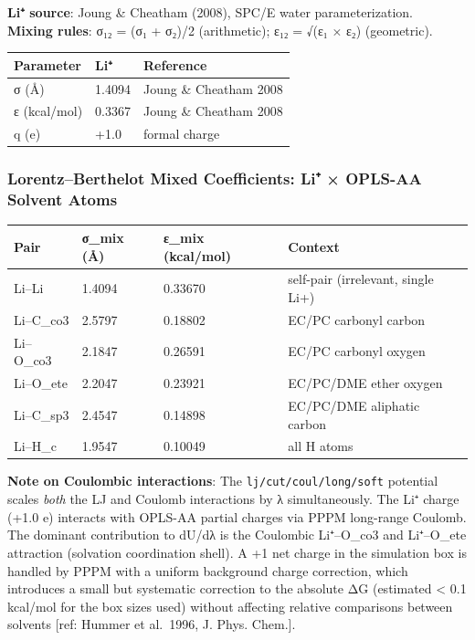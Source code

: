 \documentclass[
  11pt,
]{article}
\newcounter{none} %
\begin{document}
\textbf{Li⁺ source}: Joung \& Cheatham (2008), SPC/E water
parameterization.\\
\textbf{Mixing rules}: σ₁₂ = (σ₁ + σ₂)/2 (arithmetic); ε₁₂ = √(ε₁ × ε₂)
(geometric).

{\def\LTcaptype{none} %
\begin{longtable}[]{@{}lll@{}}
\toprule\noalign{}
Parameter & Li⁺ & Reference \\
\midrule\noalign{}
\endhead
\bottomrule\noalign{}
\endlastfoot
σ (Å) & 1.4094 & Joung \& Cheatham 2008 \\
ε (kcal/mol) & 0.3367 & Joung \& Cheatham 2008 \\
q (e) & +1.0 & formal charge \\
\end{longtable}
}

\subsubsection{Lorentz--Berthelot Mixed Coefficients: Li⁺ × OPLS-AA
Solvent
Atoms}\label{lorentzberthelot-mixed-coefficients-li-opls-aa-solvent-atoms}

{\def\LTcaptype{none} %
\begin{longtable}[]{@{}llll@{}}
\toprule\noalign{}
Pair & σ\_mix (Å) & ε\_mix (kcal/mol) & Context \\
\midrule\noalign{}
\endhead
\bottomrule\noalign{}
\endlastfoot
Li--Li & 1.4094 & 0.33670 & self-pair (irrelevant, single Li+) \\
Li--C\_co3 & 2.5797 & 0.18802 & EC/PC carbonyl carbon \\
Li--O\_co3 & 2.1847 & 0.26591 & EC/PC carbonyl oxygen \\
Li--O\_ete & 2.2047 & 0.23921 & EC/PC/DME ether oxygen \\
Li--C\_sp3 & 2.4547 & 0.14898 & EC/PC/DME aliphatic carbon \\
Li--H\_c & 1.9547 & 0.10049 & all H atoms \\
\end{longtable}
}

\textbf{Note on Coulombic interactions}: The
\texttt{lj/cut/coul/long/soft} potential scales \emph{both} the LJ and
Coulomb interactions by λ simultaneously. The Li⁺ charge (+1.0 e)
interacts with OPLS-AA partial charges via PPPM long-range Coulomb. The
dominant contribution to dU/dλ is the Coulombic Li⁺--O\_co3 and
Li⁺--O\_ete attraction (solvation coordination shell). A +1 net charge
in the simulation box is handled by PPPM with a uniform background
charge correction, which introduces a small but systematic correction to
the absolute ΔG (estimated \textless{} 0.1 kcal/mol for the box sizes
used) without affecting relative comparisons between solvents {[}ref:
Hummer et al.~1996, J. Phys. Chem.{]}.
\end{document}
